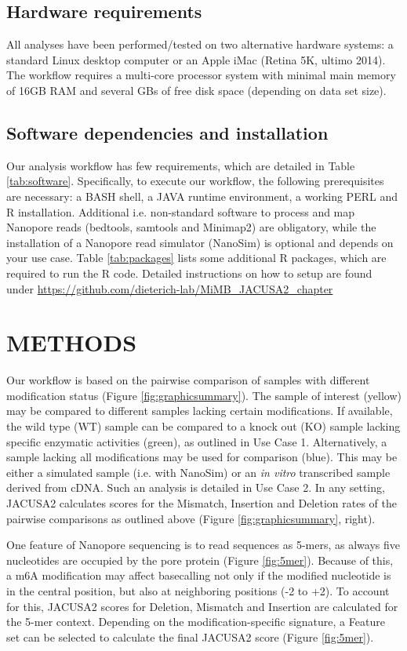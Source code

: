 \documentclass[times, 11pt, a4paper]{article}
\begin{document}
\subsection*{Hardware requirements}
All analyses have been performed/tested on two alternative hardware systems:
a standard Linux desktop computer or an Apple iMac (Retina 5K, ultimo 2014).
The workflow requires a multi-core processor system with minimal main memory of 16GB RAM
and several GBs of free disk space (depending on data set size).

\subsection*{Software dependencies and installation}
Our analysis workflow has few requirements, which are detailed in Table \ref{tab:software}. Specifically, to execute our workflow, the following prerequisites are necessary: a BASH shell, a JAVA runtime environment, a working PERL and R installation. Additional i.e. non-standard software to process and map Nanopore reads (bedtools, samtools and Minimap2) are obligatory, while the installation of a Nanopore read simulator (NanoSim) is optional and depends on your use case. Table \ref{tab:packages} lists some additional R packages, which are required to run the R code. Detailed instructions on how to setup are found under \url{https://github.com/dieterich-lab/MiMB_JACUSA2_chapter} 

\section*{METHODS}
Our workflow is based on the pairwise comparison of samples with different modification status (Figure \ref{fig:graphicsummary}). The sample of interest (yellow) may be compared to different samples lacking certain modifications. If available, the wild type (WT) sample can be compared to a knock out (KO) sample lacking specific enzymatic activities (green), as outlined in Use Case 1. Alternatively, a sample lacking all modifications may be used for comparison (blue). This may be either a simulated sample (i.e. with NanoSim) or an \textit{in vitro} transcribed sample derived from cDNA. Such an analysis is detailed in Use Case 2. In any setting, JACUSA2 calculates scores for the Mismatch, Insertion and Deletion rates of the pairwise comparisons as outlined above (Figure \ref{fig:graphicsummary}, right).

One feature of Nanopore sequencing is to read sequences as 5-mers, as always five nucleotides are occupied by the pore protein (Figure \ref{fig:5mer}). Because of this, a m6A modification may affect basecalling not only if the modified nucleotide is in the central position, but also at neighboring positions (-2 to +2). To account for this, JACUSA2 scores for Deletion, Mismatch and Insertion are calculated for the 5-mer context. Depending on the modification-specific signature, a Feature set can be selected to calculate the final JACUSA2 score (Figure \ref{fig:5mer}).
\end{document}
